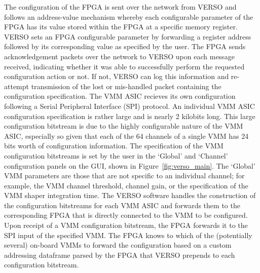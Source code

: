 \noindent The configuration of the FPGA is sent over the network from VERSO and
follows an address-value mechanism whereby each configurable parameter of the FPGA has its
value stored within the FPGA at a specific memory register.
VERSO sets an FPGA configurable parameter by forwarding a register address followed by its corresponding
value as specified by the user.
The FPGA sends acknowledgement packets over the network to VERSO upon each message received,
indicating whether it was able to successfully perform the requested configuration action or not.
If not, VERSO can log this information and re-attempt transmission of the lost or mis-handled packet
containing the configuration specification.
The VMM ASIC recieves its own configuration following a Serial Peripheral Interface (SPI) protocol.
An individual VMM ASIC configuration specification is rather large and is nearly 2 kilobits long.
This large configuration bitstream is due to the highly configurable nature of the VMM ASIC, especially
so given that each of the 64 channels of a single VMM has 24 bits worth of configuration information.
The specification of the VMM configuration bitstreams is set by the user in the `Global' and `Channel' configuration
panels on the GUI, shown in Figure~\ref{fig:verso_main}.
The `Global' VMM parameters are those that are not specific to an individual channel; for example,
the VMM channel threshold, channel gain, or the specification of the VMM shaper integration time.
The VERSO software handles the construction of the configuration bitstreams for each VMM ASIC and forwards
them to the corresponding FPGA that is directly connected to the VMM to be configured.
Upon receipt of a VMM configuration bitstream, the FPGA forwards it to the SPI input of the specified VMM.
The FPGA knows to which of the (potentially several) on-board VMMs to forward the configuration based on
a custom addressing dataframe parsed by the FPGA that VERSO prepends to each configuration bitstream.

